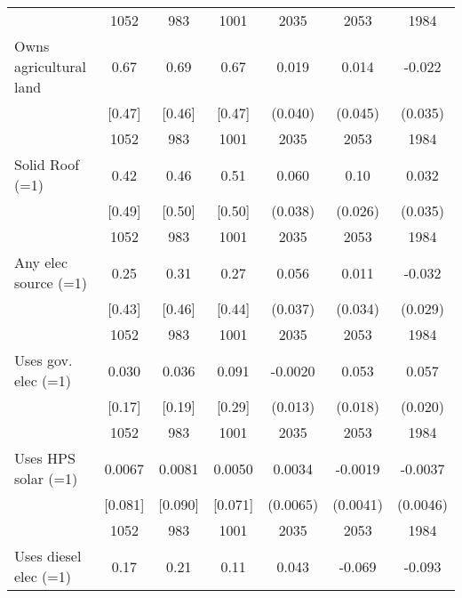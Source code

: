 \begin{table}[htbp]
\begin{tabular*}{1\hsize}{@{\hskip\tabcolsep\extracolsep\fill}l*{1}{cccccc}}
                                &     1052&      983&     1001&     2035         &     2053         &     1984         \\
Owns agricultural land          &     0.67&     0.69&     0.67&    0.019         &    0.014         &   -0.022         \\
                                &   [0.47]&   [0.46]&   [0.47]&  (0.040)         &  (0.045)         &  (0.035)         \\
                                &     1052&      983&     1001&     2035         &     2053         &     1984         \\
Solid Roof (=1)                 &     0.42&     0.46&     0.51&    0.060         &     0.10\sym{***}&    0.032         \\
                                &   [0.49]&   [0.50]&   [0.50]&  (0.038)         &  (0.026)         &  (0.035)         \\
                                &     1052&      983&     1001&     2035         &     2053         &     1984         \\
Any elec source (=1)            &     0.25&     0.31&     0.27&    0.056         &    0.011         &   -0.032         \\
                                &   [0.43]&   [0.46]&   [0.44]&  (0.037)         &  (0.034)         &  (0.029)         \\
                                &     1052&      983&     1001&     2035         &     2053         &     1984         \\
Uses gov. elec (=1)             &    0.030&    0.036&    0.091&  -0.0020         &    0.053\sym{***}&    0.057\sym{***}\\
                                &   [0.17]&   [0.19]&   [0.29]&  (0.013)         &  (0.018)         &  (0.020)         \\
                                &     1052&      983&     1001&     2035         &     2053         &     1984         \\
Uses HPS solar (=1)             &   0.0067&   0.0081&   0.0050&   0.0034         &  -0.0019         &  -0.0037         \\
                                &  [0.081]&  [0.090]&  [0.071]& (0.0065)         & (0.0041)         & (0.0046)         \\
                                &     1052&      983&     1001&     2035         &     2053         &     1984         \\
Uses diesel elec (=1)           &     0.17&     0.21&     0.11&    0.043         &   -0.069\sym{**} &   -0.093\sym{**} \\

\end{tabular*}
\end{table}

